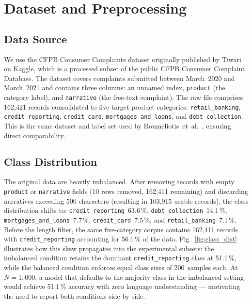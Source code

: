 \documentclass[journal]{IEEEtran}
\begin{document}
\section{Dataset and Preprocessing}
\label{sec:data}

\subsection{Data Source}

We use the CFPB Consumer Complaints dataset originally published by
Tiwari \cite{tiwari2021cfpb} on Kaggle, which is a processed subset
of the public CFPB Consumer Complaint Database. The dataset covers
complaints submitted between March~2020 and March~2021 and contains
three columns: an unnamed index, \texttt{product} (the category label),
and \texttt{narrative} (the free-text complaint). The raw file
comprises 162,421 records consolidated to five target product categories:
\texttt{retail\_banking}, \texttt{credit\_reporting},
\texttt{credit\_card}, \texttt{mortgages\_and\_loans}, and
\texttt{debt\_collection}. This is the same dataset and label set used
by Roumeliotis~et~al.\ \cite{roumeliotis2025think}, ensuring
direct comparability.

\subsection{Class Distribution}

The original data are heavily imbalanced. After removing records with
empty \texttt{product} or \texttt{narrative} fields (10 rows removed,
162,411 remaining) and discarding narratives exceeding 500 characters
(resulting in 103,915 usable records), the class distribution shifts
to: \texttt{credit\_reporting}~63.6\,\%,
\texttt{debt\_collection}~14.1\,\%,
\texttt{mortgages\_and\_loans}~7.7\,\%,
\texttt{credit\_card}~7.5\,\%, and
\texttt{retail\_banking}~7.1\,\%. Before the length filter, the same
five-category corpus contains 162,411 records with
\texttt{credit\_reporting} accounting for 56.1\,\% of the data.
Fig.~\ref{fig:class_dist} illustrates how this skew propagates into
the experimental subsets: the imbalanced condition retains the
dominant \texttt{credit\_reporting} class at 51.1\,\%, while the
balanced condition enforces equal class sizes of 200~samples each.
At $N{=}1{,}000$, a model that defaults to the majority class in the
imbalanced setting would achieve 51.1\,\% accuracy with zero
language understanding — motivating the need to report both conditions
side by side.
\end{document}
